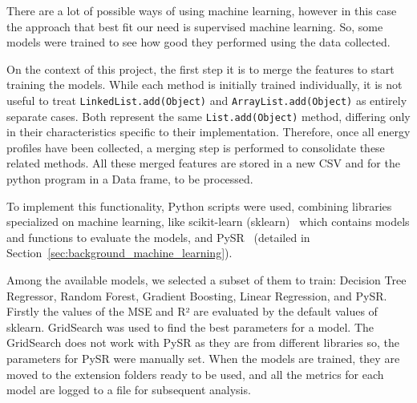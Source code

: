 There are a lot of possible ways of using machine learning, however in this case the approach that best fit our need is supervised machine learning. So, some models were trained to see how good they performed using the data collected.

 

On the context of this project, the first step it is to merge the features to start training the models. While each method is initially trained individually, it is not useful to treat \texttt{LinkedList.\allowbreak add(Object)} and \texttt{ArrayList.\allowbreak add(Object)} as entirely separate cases. Both represent the same \texttt{List.\allowbreak add(Object)} method, differing only in their characteristics specific to their implementation. Therefore, once all energy profiles have been collected, a merging step is performed to consolidate these related methods. All these merged features are stored in a new CSV and for the python program in a Data frame, to be processed.

To implement this functionality, Python scripts were used, combining libraries specialized on machine learning, like scikit-learn (sklearn)~\cite{scikit-learn} which contains models and functions to evaluate the models, and PySR~\cite{cranmer2023interpretablemachinelearningscience} (detailed in Section~\ref{sec:background_machine_learning}).

Among the available models, we selected a subset of them to train: Decision Tree Regressor, Random Forest, Gradient Boosting, Linear Regression, and PySR. Firstly the values of the MSE and R² are evaluated by the default values of sklearn. GridSearch was used to find the best parameters for a model. The GridSearch does not work with PySR as they are from different libraries so, the parameters for PySR were manually set. When the models are trained, they are moved to the extension folders ready to be used, and all the metrics for each model are logged to a file for subsequent analysis.


